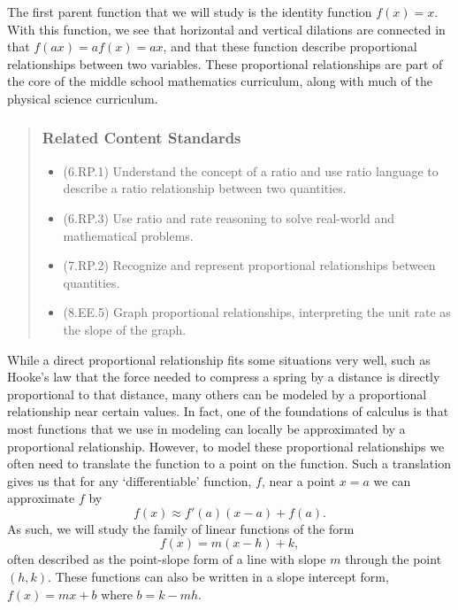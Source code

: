 \documentclass[
]{book}
\providecommand{\tightlist}{%
  \setlength{\itemsep}{0pt}\setlength{\parskip}{0pt}}
\theoremstyle{definition}
\theoremstyle{definition}
\theoremstyle{definition}
\theoremstyle{remark}
\begin{document}
The first parent function that we will study is the identity function \(f(x)=x\). With this function, we see that horizontal and vertical dilations are connected in that \(f(ax)=a f(x) = ax\), and that these function describe proportional relationships between two variables. These proportional relationships are part of the core of the middle school mathematics curriculum, along with much of the physical science curriculum.

\begin{quote}
\hypertarget{related-content-standards-42}{%
\subsubsection*{Related Content Standards}\label{related-content-standards-42}}

\begin{itemize}
\tightlist
\item
  (6.RP.1) Understand the concept of a ratio and use ratio language to describe a ratio relationship between two quantities.
\item
  (6.RP.3) Use ratio and rate reasoning to solve real-world and mathematical problems.
\item
  (7.RP.2) Recognize and represent proportional relationships between quantities.
\item
  (8.EE.5) Graph proportional relationships, interpreting the unit rate as the slope of the graph.
\end{itemize}
\end{quote}

While a direct proportional relationship fits some situations very well, such as Hooke's law that the force needed to compress a spring by a distance is directly proportional to that distance, many others can be modeled by a proportional relationship near certain values. In fact, one of the foundations of calculus is that most functions that we use in modeling can locally be approximated by a proportional relationship. However, to model these proportional relationships we often need to translate the function to a point on the function. Such a translation gives us that for any `differentiable' function, \(f\), near a point \(x=a\) we can approximate \(f\) by \[f(x) \approx f'(a)(x-a) + f(a).\] As such, we will study the family of linear functions of the form
\[f(x)=m(x-h)+k,\] often described as the point-slope form of a line with slope \(m\) through the point \((h,k)\). These functions can also be written in a slope intercept form, \(f(x)=mx+b\) where \(b=k-mh\).
\end{document}
